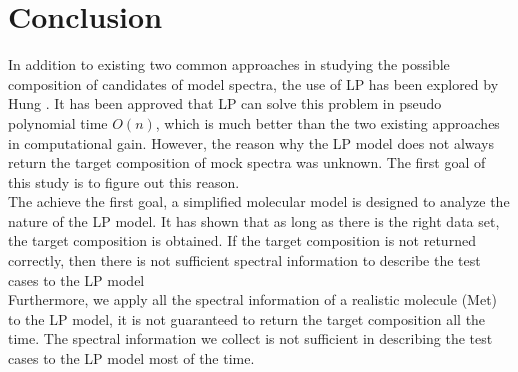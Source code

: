   \label{ch:7}

\section{Conclusion}
In addition to existing two common approaches in studying the possible composition of candidates of model spectra, the use of LP has been explored by Hung \cite{KuoKaiHung:Thesis:2015}. It has been approved that LP can solve this problem in  pseudo polynomial time $O(n)$, which is much better than the two existing approaches in computational gain. However, the reason why the LP model does not always return the target composition of mock spectra was unknown. The first goal of this study is to figure out this reason. \\

The achieve the first goal, a simplified molecular model is designed to analyze the nature of the LP model. It has shown that as long as there is the right data set, the target composition is obtained. If the target composition is not returned correctly, then there is not sufficient spectral information to describe the test cases to the LP model \\

Furthermore, we apply all the spectral information of a realistic molecule (Met) to the LP model, it is not guaranteed to return the target composition all the time. The spectral information we collect is not sufficient in describing the test cases to the LP model most of the time. \\



